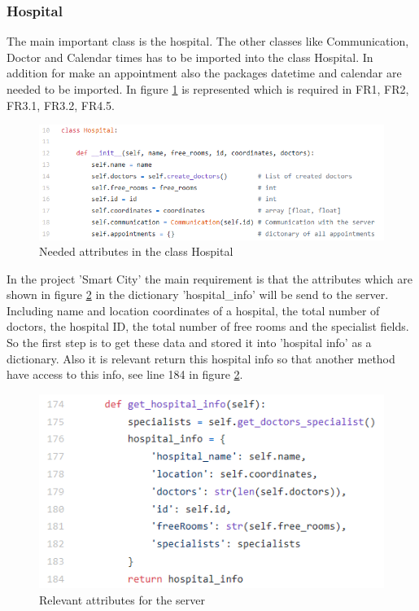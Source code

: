 \subsubsection{Hospital}
The main important class is the hospital. The other classes like Communication, Doctor and Calendar times has to be imported into the class Hospital. In addition for make an appointment also the packages datetime and calendar are needed to be imported. In figure \ref{hospital_attributes} is represented which is required in FR1, FR2, FR3.1, FR3.2, FR4.5.

\begin{figure}
\centering
\sidecaption
\includegraphics[scale=.65]{images/melanie_images/Relevant_attributes_in_the_hopital_class.png}
\caption{Needed attributes in the class Hospital}
\label{hospital_attributes}
\end{figure}


In the project 'Smart City' the main requirement is that the attributes which are shown in figure \ref{Relevant_attributes_server} in the dictionary 'hospital_info' will be send to the server. Including name and location coordinates of a hospital, the total number of doctors, the hospital ID, the total number of free rooms and the specialist fields. So the first step is to get these data and stored it into 'hospital info' as a dictionary. Also it is relevant return this hospital info so that another method have access to this info, see line 184 in figure \ref{Relevant_attributes_server}. 

\begin{figure}
\centering
\sidecaption
\includegraphics[scale=.65]{images/melanie_images/get_hospital_info.png}
\caption{Relevant attributes for the server}
\label{Relevant_attributes_server}
\end{figure}

